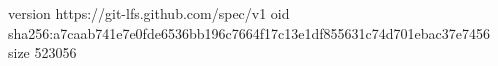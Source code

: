 version https://git-lfs.github.com/spec/v1
oid sha256:a7caab741e7e0fde6536bb196c7664f17c13e1df855631c74d701ebac37e7456
size 523056
